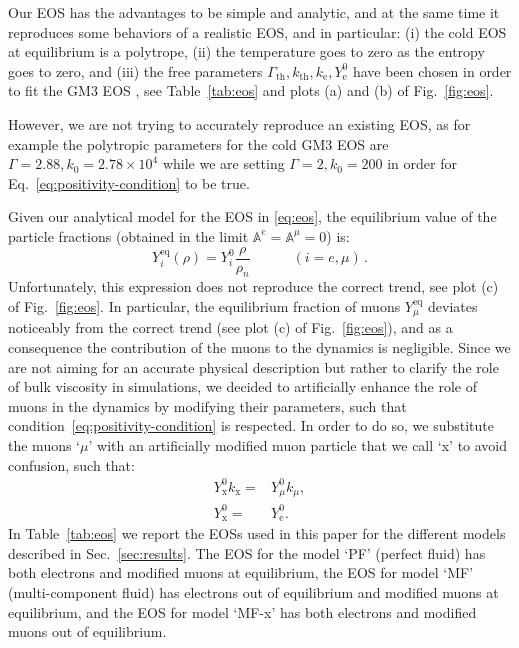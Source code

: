 \documentclass[aps,prd,twocolumn,a4paper,floatfix,nofootbib,superscriptaddress,nofootinbib]{revtex4}
\newcommand{\rth}{\mathrm{th}}
\newcommand{\re}{\mathrm{e}}
\newcommand{\req}{\mathrm{eq}}
\newcommand{\rx}{\mathrm{x}}
\begin{document}
Our EOS has the advantages to be simple and analytic, and at the same time it
reproduces some behaviors of a realistic EOS, and in particular: (i) the cold
EOS at equilibrium is a polytrope, (ii) the temperature goes to zero as the
entropy goes to zero, and (iii) the free parameters
$\Gamma_\rth,k_\rth,k_\re,Y_\re^0$ have been chosen in order to fit the GM3
EOS \cite{Glendenning85, Glendenning91}, see Table~\ref{tab:eos} and plots (a) and (b)
of Fig.~\ref{fig:eos}.

However, we are not trying to accurately reproduce an existing EOS, as for example the
polytropic parameters for the cold GM3 EOS are $\Gamma=2.88,
k_0=2.78\times10^4$ while we are setting $\Gamma=2, k_0=200$ in order for
Eq.~\eqref{eq:positivity-condition} to be true.

Given our analytical model for the EOS in \eqref{eq:eos}, the equilibrium value of the particle fractions 
(obtained in the limit $\mathbb A^e=\mathbb A^\mu=0$) is:
%
\begin{equation}
Y^\req_i(\rho)=Y^0_i\frac{\rho}{\rho_n} \qquad \quad (i=e,\mu) \, .
\end{equation}
%
Unfortunately, this expression does not reproduce the correct trend, see plot (c) of Fig.~\ref{fig:eos}.
In particular, the equilibrium fraction of muons $Y^\req_\mu$ deviates noticeably from the
correct trend (see plot (c) of Fig.~\ref{fig:eos}), and as a consequence the
contribution of the muons to the dynamics is negligible.
Since we are not aiming for an accurate physical description but
rather to clarify the role of bulk viscosity in simulations, we decided to artificially
enhance the role of muons in the dynamics by modifying their parameters, such that
condition~\eqref{eq:positivity-condition} is respected.
In order to do so, we substitute the muons `$\mu$' with an artificially modified muon particle
that we call `x' to avoid confusion, such that:
%
\begin{align}
Y_\rx^0 k_\rx={}& Y_\mu^0 k_\mu,\\
Y_\rx^0 = {}& Y_\re^0.
\end{align}
%
In Table~\ref{tab:eos} we report the EOSs used in this paper for the different
models described in Sec.~\ref{sec:results}. The EOS for the model `PF' (perfect fluid)
has both electrons and modified muons at equilibrium, the EOS
for model `MF' (multi-component fluid) has electrons out of equilibrium and modified muons
at equilibrium, and the EOS for model `MF-x' has both electrons and modified muons
out of equilibrium.
\end{document}
